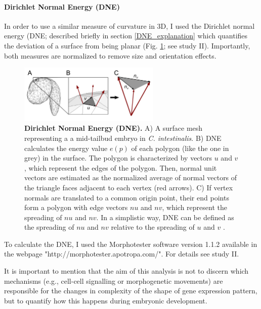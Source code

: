 \paragraph{Dirichlet Normal Energy (DNE)}
In order to use a similar measure of curvature in 3D, I used the Dirichlet normal energy (DNE; described briefly in section \ref{DNE_explanation} which quantifies the deviation of a surface from being planar (Fig. \ref{fig:DNE}; see study II). 
Importantly, both measures are normalized to remove size and orientation effects.

\begin{figure}[h]
  \includegraphics[width=0.6\textwidth]{./Images/DNE.png}
  \centering
  \caption{\textbf{Dirichlet Normal Energy (DNE).} A) A surface mesh representing a a mid-tailbud embryo in \textit{C. intestinalis}. B) DNE calculates the energy value $e(p)$ of each polygon (like the one in grey) in the surface. The polygon is characterized by vectors $u$ and $v$, which represent the edges of the polygon. Then, normal unit vectors are estimated as the normalized average of normal vectors of the triangle faces adjacent to each vertex (red arrows). C) If vertex normals are translated to a common origin point, their end points form a polygon with edge vectors $nu$ and $nv$, which represent the spreading of $nu$ and $nv$. In a simplistic way, DNE can be defined as the spreading of $nu$ and $nv$ relative to the spreading of $u$ and $v$  \citep{Bunn2011,Winchester2016}.
 }
  \label{fig:DNE}
\end{figure}

To calculate the DNE, I used the Morphotester software version 1.1.2 \citep{Winchester2016}
available in the webpage "http://morphotester.apotropa.com/". For details see study II.

It is important to mention that the aim of this analysis is not to discern which mechanisms (e.g., cell-cell signalling or morphogenetic movements) are responsible for the changes in complexity of the shape of gene expression pattern, but to quantify how this happens during embryonic development.

